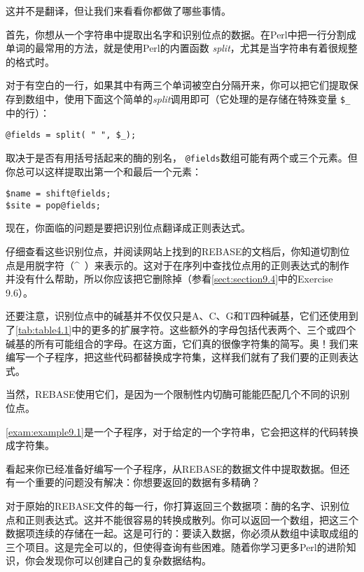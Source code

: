 这并不是翻译，但让我们来看看你都做了哪些事情。

首先，你想从一个字符串中提取出名字和识别位点的数据。在Perl中把一行分割成单词的最常用的方法，就是使用Perl的内置函数 \textit{split}，尤其是当字符串有着很规整的格式时。

对于有空白的一行，如果其中有两三个单词被空白分隔开来，你可以把它们提取保存到数组中，使用下面这个简单的\textit{split}调用即可（它处理的是存储在特殊变量 \verb|$_|中的行）：

\begin{lstlisting}
@fields = split( " ", $_);
\end{lstlisting}

取决于是否有用括号括起来的酶的别名， \verb|@fields|数组可能有两个或三个元素。但你总可以这样提取出第一个和最后一个元素：

\begin{lstlisting}
$name = shift@fields;
$site = pop@fields;
\end{lstlisting}

现在，你面临的问题是要把识别位点翻译成正则表达式。

仔细查看这些识别位点，并阅读网站上找到的REBASE的文档后，你知道切割位点是用脱字符（\^~）来表示的。这对于在序列中查找位点用的正则表达式的制作并没有什么帮助，所以你应该把它删除掉（参看\autoref{sect:section9.4}中的Exercise 9.6）。

还要注意，识别位点中的碱基并不仅仅只是A、C、G和T四种碱基，它们还使用到了\autoref{tab:table4.1}中的更多的扩展字符。这些额外的字母包括代表两个、三个或四个碱基的所有可能组合的字母。在这方面，它们真的很像字符集的简写。奥！我们来编写一个子程序，把这些代码都替换成字符集，这样我们就有了我们要的正则表达式。

当然，REBASE使用它们，是因为一个限制性内切酶可能能匹配几个不同的识别位点。

\autoref{exam:example9.1}是一个子程序，对于给定的一个字符串，它会把这样的代码转换成字符集。



看起来你已经准备好编写一个子程序，从REBASE的数据文件中提取数据。但还有一个重要的问题没有解决：你想要返回的数据有多精确？

对于原始的REBASE文件的每一行，你打算返回三个数据项：酶的名字、识别位点和正则表达式。这并不能很容易的转换成散列。你可以返回一个数组，把这三个数据项连续的存储在一起。这是可行的：要读入数据，你必须从数组中读取成组的三个项目。这是完全可以的，但使得查询有些困难。随着你学习更多Perl的进阶知识，你会发现你可以创建自己的复杂数据结构。

